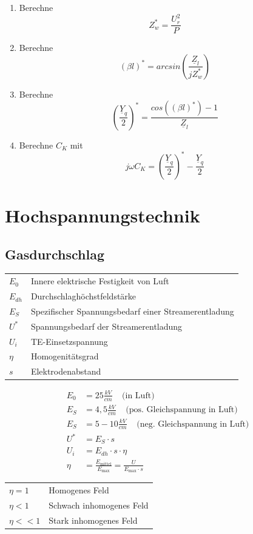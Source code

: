 \documentclass[a4paper,twocolumn,10pt]{article}
\begin{document}
\begin{enumerate}
\item Berechne
\begin{equation*}
Z_w^*=\frac{U_r^2}{P}
\end{equation*}
\item Berechne
\begin{equation*}
(\beta l)^*=arcsin\left(\frac{\underline{Z}_l}{jZ_w^*}\right)
\end{equation*}
\item Berechne
\begin{equation*}
\left(\frac{\underline{Y}_q}{2}\right)^*=\frac{cos\left((\beta l)^*\right)-1}{\underline{Z}_l}
\end{equation*}
\item Berechne $C_K$ mit
\begin{equation*}
j\omega C_K=\left(\frac{\underline{Y}_q}{2}\right)^*-\frac{\underline{Y}_q}{2}
\end{equation*}
\end{enumerate}

\section{Hochspannungstechnik}

\subsection{Gasdurchschlag}
\begin{tabular}{ll}
$E_0$ & Innere elektrische Festigkeit von Luft\\
$E_{dh}$ & Durchschlaghöchstfeldstärke\\
$E_S$ & Spezifischer Spannungsbedarf einer Streamerentladung\\
$U^*$ & Spannungsbedarf der Streamerentladung\\
$U_i$ & TE-Einsetzspannung\\
$\eta$ & Homogenitätsgrad\\
$s$ & Elektrodenabstand
\end{tabular}
\begin{equation*}
\begin{split}
E_0&= 25\frac{kV}{cm}\;\;\;\;\text{(in Luft)}\\
E_S&=4,5\frac{kV}{cm}\;\;\;\;\text{(pos. Gleichspannung in Luft)}\\
E_S&=5-10\frac{kV}{cm}\;\;\;\;\text{(neg. Gleichspannung in Luft)}\\
U^*&=E_S\cdot s\\
U_i&=E_{dh}\cdot s\cdot \eta\\
\eta &=\frac{E_{\text{mittel}}}{E_{\text{max}}}=\frac{U}{E_{\text{max}}\cdot s}
\end{split}
\end{equation*}
\begin{tabular}{ll}
$\eta =1$ & Homogenes Feld\\
$\eta <1$ & Schwach inhomogenes Feld\\
$\eta <<1$ & Stark inhomogenes Feld
\end{tabular}
\end{document}
